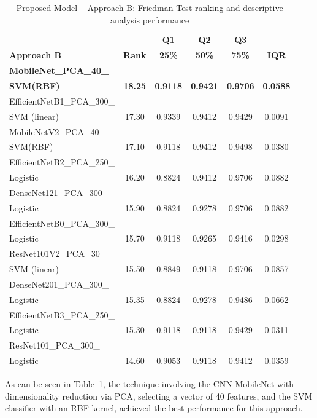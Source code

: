 \documentclass[preprint,12pt]{elsarticle}
\begin{document}
\begin{table}[h!]
	\caption{Proposed Model – Approach B: Friedman Test ranking and descriptive analysis performance}
	\label{tab:Approach_B_ranking}
	\centering
	\begin{tabular}{|l|c|c|c|c|c|}
		\hline
		\textbf{} & \textbf{} & \textbf{Q1} & \textbf{Q2} & \textbf{Q3} & \textbf{} \\
		\textbf{Approach B} & \textbf{Rank} & \textbf{25\%} & \textbf{50\%} & \textbf{75\%} & \textbf{IQR} \\
		\hline
		\textbf{MobileNet\_PCA\_40\_} & & & & & \\
		\textbf{SVM(RBF)} & \textbf{18.25} & \textbf{0.9118} & \textbf{0.9421} & \textbf{0.9706} & \textbf{0.0588} \\
		EfficientNetB1\_PCA\_300\_ &  &  &  &  &  \\
		SVM (linear) & 17.30 & 0.9339 & 0.9412 & 0.9429 & 0.0091 \\
		MobileNetV2\_PCA\_40\_ & & & & & \\
		SVM(RBF) & 17.10 & 0.9118 & 0.9412 & 0.9498 & 0.0380 \\
		EfficientNetB2\_PCA\_250\_ & & & & & \\
		Logistic & 16.20 & 0.8824 & 0.9412 & 0.9706 & 0.0882 \\
		DenseNet121\_PCA\_300\_ & & & & & \\
		Logistic & 15.90 & 0.8824 & 0.9278 & 0.9706 & 0.0882 \\
		EfficientNetB0\_PCA\_300\_ & & & & & \\
		Logistic & 15.70 & 0.9118 & 0.9265 & 0.9416 & 0.0298 \\
		ResNet101V2\_PCA\_30\_ & & & & & \\
		SVM (linear) & 15.50 & 0.8849 & 0.9118 & 0.9706 & 0.0857 \\
		DenseNet201\_PCA\_300\_ & & & & & \\
		Logistic & 15.35 & 0.8824 & 0.9278 & 0.9486 & 0.0662 \\
		EfficientNetB3\_PCA\_250\_ & & & & & \\
		Logistic & 15.30 & 0.9118 & 0.9118 & 0.9429 & 0.0311 \\
		ResNet101\_PCA\_300\_ & & & & & \\
		Logistic & 14.60 & 0.9053 & 0.9118 & 0.9412 & 0.0359 \\
		\hline
	\end{tabular}
\end{table}

As can be seen in Table~\ref{tab:Approach_B_ranking}, the technique involving the CNN MobileNet with dimensionality reduction via PCA, selecting a vector of 40 features, and the SVM classifier with an RBF kernel, achieved the best performance for this approach.
\end{document}
